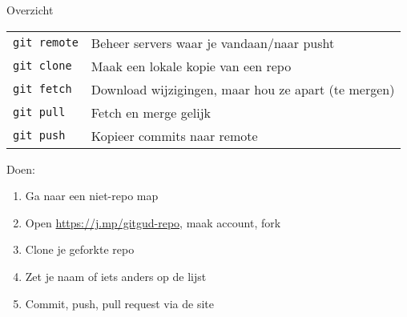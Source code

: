 \begin{frame}{Overzicht}
	\begin{tabular}{ll}
		\texttt{git remote}		& Beheer servers waar je vandaan/naar pusht\\
		\texttt{git clone}		& Maak een lokale kopie van een repo\\
		\texttt{git fetch}		& Download wijzigingen, maar hou ze apart (te mergen)\\
		\texttt{git pull}		& Fetch en merge gelijk\\
		\texttt{git push}		& Kopieer commits naar remote
	\end{tabular}
	Doen:
	\begin{enumerate}
		\item Ga naar een niet-repo map
		\item Open \url{https://j.mp/gitgud-repo}, maak account, fork
		\item Clone je geforkte repo
		\item Zet je naam of iets anders op de lijst
		\item Commit, push, pull request via de site
	\end{enumerate}
\end{frame}
